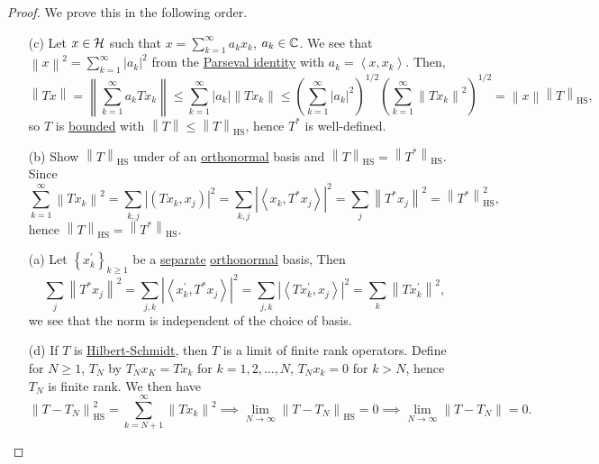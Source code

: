 \begin{proof}
	We prove this in the following order.
	\begin{enumerate}
		\item[(c)] Let \(x\in \mathcal{\MakeUppercase{h}} \) such that \(x = \sum_{k=1}^{\infty} a_{k} x_{k} \), \(a_{k} \in \mathbb{\MakeUppercase{c}} \). We see that \(\left\lVert x\right\rVert ^{2} = \sum_{k=1}^{\infty}\left\vert a_{k}  \right\vert ^{2} \) from the \hyperref[col:Parseval]{Parseval identity} with \(a_{k} = \left\langle x, x_{k}  \right\rangle \). Then,
			\[
				\left\lVert Tx\right\rVert
				= \left\lVert \sum_{k=1}^{\infty} a_{k} Tx_{k} \right\rVert
				\leq \sum_{k=1}^{\infty} \left\vert a_{k}  \right\vert \left\lVert T x_{k} \right\rVert
				\leq \left( \sum_{k=1}^{\infty} \left\vert a_{k} \right\vert ^2 \right) ^{1 / 2} \left( \sum_{k=1}^{\infty} \left\lVert T x_{k} \right\rVert ^{2} \right) ^{1 / 2}
				= \left\lVert x\right\rVert \left\lVert T\right\rVert _{\mathrm{HS}},
			\]
			so \(T\) is \hyperref[def:bounded-linear-op]{bounded} with \(\left\lVert T\right\rVert \leq \left\lVert T\right\rVert _{\mathrm{HS} }\), hence \(T^{\ast} \) is well-defined.
		\item[(b)] Show \(\left\lVert T\right\rVert _{\mathrm{HS} }\) under of an \hyperref[def:orthonormal-system]{orthonormal} basis and \(\left\lVert T\right\rVert _{\mathrm{HS} }= \left\lVert T^{\ast} \right\rVert _{\mathrm{HS} } \). Since
			\[
				\sum_{k=1}^{\infty} \left\lVert Tx_{k} \right\rVert ^{2}
				= \sum_{k, j} \left\vert \left( T x_{k} , x_{j}  \right)  \right\vert ^{2}
				= \sum_{k, j} \left\vert \left\langle x_{k} , T^{\ast} x_{j}  \right\rangle  \right\vert ^{2}
				= \sum_{j} \left\lVert T^{\ast} x_{j} \right\rVert ^{2}
				= \left\lVert T^{\ast} \right\rVert ^{2} _{\mathrm{HS} },
			\]
			hence \(\left\lVert T\right\rVert _{\mathrm{HS} } = \left\lVert T^{\ast} \right\rVert _{\mathrm{HS} }\).
		\item[(a)] Let \(\left\{ x^\prime _k \right\}_{k\geq 1} \) be a \hyperref[def:separable]{separate} \hyperref[def:orthonormal-system]{orthonormal} basis, Then
			\[
				\sum_{j} \left\lVert T^{\ast} x_{j} \right\rVert ^{2}
				= \sum_{j, k} \left\vert \left\langle x^\prime _{k} , T^{\ast} x_{j}  \right\rangle  \right\vert ^{2}
				= \sum_{j, k} \left\vert \left\langle T x^\prime _{k} , x_{j}  \right\rangle  \right\vert ^{2}
				= \sum_{k} \left\lVert T x^\prime _{k} \right\rVert ^{2},
			\]
			we see that the norm is independent of the choice of basis.
		\item[(d)] If \(T\) is \hyperref[def:Hilbert-Schmidt-op]{Hilbert-Schmidt}, then \(T\) is a limit of finite rank operators. Define for \(N \geq 1\), \(T_N\) by \(T_N x_K = Tx_k\) for \(k = 1, 2, \ldots  , N\), \(T_{N}x_k = 0 \) for \(k > N\), hence \(T_N\) is finite rank. We then have
			\[
				\left\lVert T - T_{N} \right\rVert ^{2} _{\mathrm{HS} }= \sum_{k=N+1}^{\infty} \left\lVert T x_{k} \right\rVert ^{2}
				\implies \lim_{N \to \infty} \left\lVert T - T_{N} \right\rVert _{\mathrm{HS} }= 0
				\implies \lim_{N \to \infty} \left\lVert T - T_N\right\rVert = 0.
			\]
	\end{enumerate}
\end{proof}

